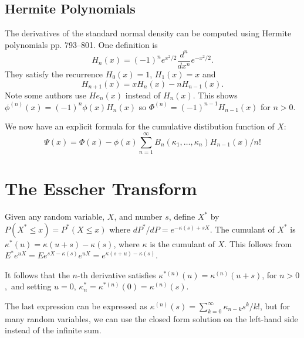 \documentclass[12pt]{article}
\theoremstyle{definition}
\begin{document}
\subsection{Hermite Polynomials}
The derivatives of the standard normal density 
can be computed using Hermite polynomials\cite{AbrSte1964}
pp. 793--801.
One definition is
\[
H_n(x) = (-1)^n e^{x^2/2}\frac{d^n}{dx^n}e^{-x^2/2}.
\]
They satisfy the recurrence \(H_0(x) = 1\), \(H_1(x) = x\) and
\[
H_{n+1}(x) = xH_n(x) - n H_{n-1}(x).
\]
Note some authors use \(He_n(x)\) instead of \(H_n(x)\).
This shows \(\phi^{(n)}(x) = (-1)^n\phi(x) H_n(x)\)
so \(\Phi^{(n)} = (-1)^{n-1} H_{n-1}(x)\) for \(n > 0\).

We now have an explicit formula for the cumulative
distibution function of \(X\):
\begin{equation}
\Psi(x) = \Phi(x) - \phi(x)\sum_{n=1}^\infty
B_n(\kappa_1,\dots,\kappa_n) H_{n-1}(x)/n!
\end{equation}

\section{The Esscher Transform}

Given any random variable, \(X\), and number \(s\), define
\(X^*\) by \(P(X^*\le x) = P^*(X\le x)\) where
\(dP^*/dP = e^{-\kappa(s) + sX}\).
The cumulant of \(X^*\) is \(\kappa^*(u) = \kappa(u + s) - \kappa(s)\),
where \(\kappa\) is the cumulant of \(X\).
This follows from \(E^* e^{uX} = Ee^{sX - \kappa(s)} e^{uX}
= e^{\kappa(s + u) - \kappa(s)}\).

It follows that the \(n\)-th derivative satisfies
\(\kappa^{*(n)}(u) = \kappa^{(n)}(u + s)\), for \(n > 0\),\
and setting $u=0$, \(\kappa^*_n = \kappa^{*(n)}(0) = \kappa^{(n)}(s)\).

The last expression can be expressed as \(\kappa^{(n)}(s) =
\sum_{k=0}^\infty \kappa_{n - k} s^k/k!\), but for many random variables,
we can use the closed form solution on the left-hand side instead of
the infinite sum.

%
%
\end{document}

